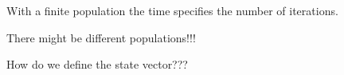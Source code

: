 \documentclass[a4paper,10pt]{article}
\begin{document}
With a finite population the time specifies the number of iterations.

There might be different populations!!!

How do we define the state vector???

\end{document}
